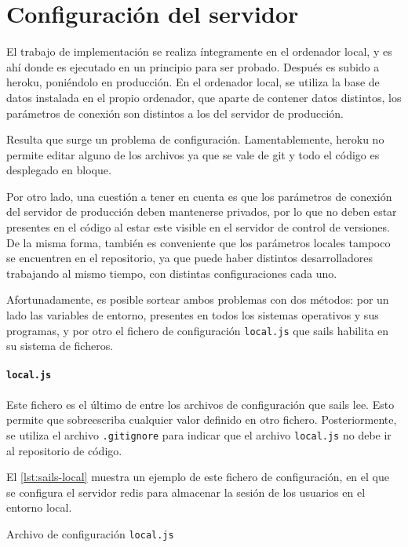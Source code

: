 \documentclass[main]{subfiles}
\begin{document}
\section{Configuración del servidor}

El trabajo de implementación se realiza íntegramente en el ordenador local, y es ahí donde es ejecutado en un principio para ser probado. Después es subido a \gls{heroku}, poniéndolo en producción. En el ordenador local, se utiliza la base de datos instalada en el propio ordenador, que aparte de contener datos distintos, los parámetros de conexión son distintos a los del servidor de producción.

Resulta que surge un problema de configuración. Lamentablemente, \gls{heroku} no permite editar alguno de los archivos ya que se vale de \gls{git} y todo el código es desplegado en bloque.

Por otro lado, una cuestión a tener en cuenta es que los parámetros de conexión del servidor de producción deben mantenerse privados, por lo que no deben estar presentes en el código al estar este visible en el servidor de control de versiones. De la misma forma, también es conveniente que los parámetros locales tampoco se encuentren en el repositorio, ya que puede haber distintos desarrolladores trabajando al mismo tiempo, con distintas configuraciones cada uno.

Afortunadamente, es posible sortear ambos problemas con dos métodos: por un lado las variables de entorno, presentes en todos los sistemas operativos y sus programas, y por otro el fichero de configuración \texttt{local.js} que \gls{sails} habilita en su sistema de ficheros.

\paragraph{\texttt{local.js}}
Este fichero es el último de entre los archivos de configuración que \gls{sails} lee. Esto permite que sobreescriba cualquier valor definido en otro fichero. Posteriormente, se utiliza el archivo \texttt{.gitignore} para indicar que el archivo \texttt{local.js} no debe ir al repositorio de código.

El \cref{lst:sails-local} muestra un ejemplo de este fichero de configuración, en el que se configura el servidor \gls{redis} para almacenar la sesión de los usuarios en el entorno local.

\begin{listing}
  \caption{Archivo de configuración \texttt{local.js}}
  \label{lst:sails-local}
\end{listing}
\end{document}
